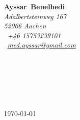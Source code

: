 

\pagestyle{empty}


\setlength{\parindent}{0pt}
\addtolength{\parskip}{6pt}

\def\firstname{Ayssar}
\def\familyname{Benelhedi}
\def\FileAuthor{\firstname~\familyname}
\def\FileTitle{\firstname~\familyname's Bewerbungsschreiben}
\def\FileSubject{Bewerbungsschreiben}
\def\FileKeyWords{\firstname~\familyname, Bewerbungsschreiben}

\renewcommand{\ttdefault}{pcr}



\hypersetup{pdfborder=0 0 0}


\sffamily   %
\hfill%
\begin{minipage}[t]{.6\textwidth}
	\raggedleft%
	{\bfseries {\color{firstnamecolor}\firstname}~{\color{firstnamecolor}\familyname}}\\[.35ex]
	\small\itshape%
	Adalbertsteinweg 167\\
	52066 Aachen\\[.35ex]
	\Mobilefone~+46 15753239101\\
	\Letter~\href{mailto:med.ayssar@gmail.com}{med.ayssar@gmail.com}
\end{minipage}\\[0.5em]
%
%
\begin{minipage}[t]{.4\textwidth}
	\raggedright%
	\vspace*{1em}
	\firmaContact\\[.15ex]
	\firmaName\\[.15ex]
	\small%
	\firmaStreet\\
	\firmaPlzCode
\end{minipage}
%
\hfill
%
\begin{minipage}[t]{.4\textwidth}
	\raggedleft %
	\today
\end{minipage}\\[1em]
\raggedright

\begin{center}
	\vspace{1.5em}
	\Large{\bfseries \color{familynamecolor}\jobName}\\[1.5em]

\end{center}

